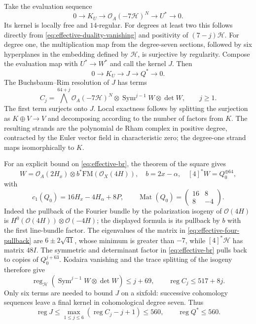 \documentclass[11pt]{article}
\theoremstyle{definition}
\theoremstyle{remark}
\begin{document}
Take the evaluation sequence
\[
 0\to K_U\to\mathcal O_A(-7\mathcal H)^N\to U^*\to0.
\]
Its kernel is locally free and $14$-regular. For degrees at least
two this follows directly from \eqref{eq:effective-duality-vanishing} and positivity of
$(7-j)\mathcal H$. For degree one, the multiplication map from
the degree-seven sections, followed by six hyperplanes in the
embedding defined by $\mathcal H$, is surjective by regularity.
Compose the evaluation map with $U^*\to W^*$ and call the kernel
$J$. Then
\begin{equation}\label{eq:effective-kernel-sequence}
 0\to K_U\to J\to Q^*\to0.                              
\end{equation}
The Buchsbaum--Rim resolution of $J$ has terms
\begin{equation}\label{eq:effective-br}
 C_j=\bigwedge^{64+j}\mathcal O_A(-7\mathcal H)^N
          \otimes\operatorname{Sym}^{j-1}W\otimes\det W,
 \qquad j\ge1.                                           
\end{equation}
The first term surjects onto $J$. Local exactness follows by
splitting the surjection as $K\oplus V\to V$ and decomposing
according to the number of factors from $K$. The resulting
strands are the polynomial de Rham complex in positive degree,
contracted by the Euler vector field in characteristic zero;
the degree-one strand maps isomorphically to $K$.

For an explicit bound on \eqref{eq:effective-br}, the theorem of the square gives
\[
 W=\mathcal O_A(2H_x)\otimes b^*\mathrm{FM}(\mathcal O_X(4H)),
 \quad b=2x-\alpha,
 \quad [4]^*W=Q_0^{\oplus64},
\]
with
\begin{equation}\label{eq:effective-four-pullback}
 c_1(Q_0)=16H_x-4H_\alpha+8P,\qquad
 \operatorname{Mat}(Q_0)=\begin{pmatrix}16&8\\8&-4\end{pmatrix}.
\end{equation}
Indeed the pullback of the Fourier bundle by the polarization
isogeny of $\mathcal O(4H)$ is
$H^0(\mathcal O(4H))\otimes\mathcal O(-4H)$; the displayed
formula is its pullback by $b$ with the first line-bundle factor.
The eigenvalues of the matrix in \eqref{eq:effective-four-pullback} are $6\pm2\sqrt{41}$,
whose minimum is greater than $-7$, while
$[4]^*\mathcal H$ has matrix $48I$. The symmetric and determinant
factor in \eqref{eq:effective-br} pulls back to copies of $Q_0^{j+63}$.
Kodaira vanishing and the trace splitting of the isogeny therefore
give
\begin{equation}\label{eq:effective-term-regularity}
 \operatorname{reg}_{\mathcal H}
   (\operatorname{Sym}^{j-1}W\otimes\det W)\le j+69,
 \qquad \operatorname{reg}C_j\le517+8j.                  
\end{equation}
Only six terms are needed to bound $J$ on a sixfold: successive
cohomology sequences leave a final kernel in cohomological
degree seven. Thus
\begin{equation}\label{eq:effective-reg560}
 \operatorname{reg}J\le
 \max_{1\le j\le6}(\operatorname{reg}C_j-j+1)
 \le560,\qquad\operatorname{reg}Q^*\le560.               
\end{equation}
\end{document}
